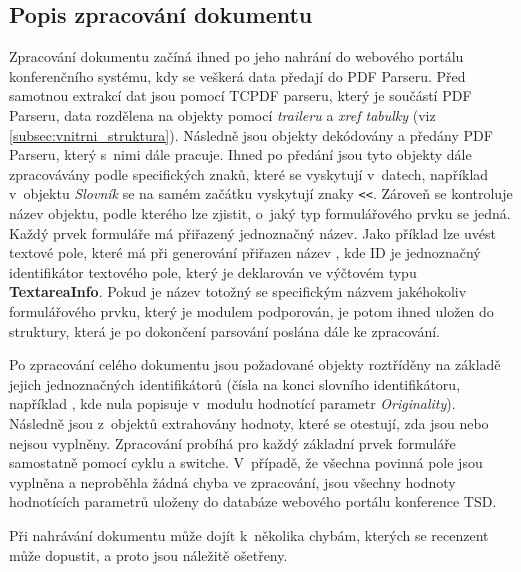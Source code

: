\subsection{Popis zpracování dokumentu}
Zpracování dokumentu začíná ihned po jeho nahrání do webového portálu konferenčního systému, kdy se veškerá data předají do PDF Parseru. Před samotnou extrakcí dat jsou pomocí TCPDF parseru, který je součástí PDF Parseru, data rozdělena na objekty pomocí \textit{traileru} a \textit{xref tabulky} (viz \ref{subsec:vnitrni_struktura}). Následně jsou objekty dekódovány a předány PDF Parseru, který s~nimi dále pracuje. Ihned po předání jsou tyto objekty dále zpracovávány podle specifických znaků, které se vyskytují v~datech, například v~objektu \textit{Slovník} se na samém začátku vyskytují znaky \verb|<<|. Zároveň se kontroluje název objektu, podle kterého lze zjistit, o~jaký typ formulářového prvku se jedná. Každý prvek formuláře má přiřazený jednoznačný název. Jako příklad lze uvést textové pole, které má při generování přiřazen název , kde ID je jednoznačný identifikátor textového pole, který je deklarován ve výčtovém typu \textbf{TextareaInfo}. Pokud je název totožný se specifickým názvem jakéhokoliv formulářového prvku, který je modulem podporován, je potom ihned uložen do struktury, která je po dokončení parsování poslána dále ke zpracování. 
\par
Po zpracování celého dokumentu jsou požadované objekty roztříděny na základě jejich jednoznačných identifikátorů (čísla na konci slovního identifikátoru, například , kde nula popisuje v~modulu hodnotící parametr \textit{Originality}). Následně jsou z~objektů extrahovány hodnoty, které se otestují, zda jsou nebo nejsou vyplněny. Zpracování probíhá pro každý základní prvek formuláře samostatně pomocí cyklu a switche. V~případě, že všechna povinná pole jsou vyplněna a neproběhla žádná chyba ve zpracování, jsou všechny hodnoty hodnotících parametrů uloženy do databáze webového portálu konference TSD.
\par
Při nahrávání dokumentu může dojít k~několika chybám, kterých se recenzent může dopustit, a proto jsou náležitě ošetřeny.
